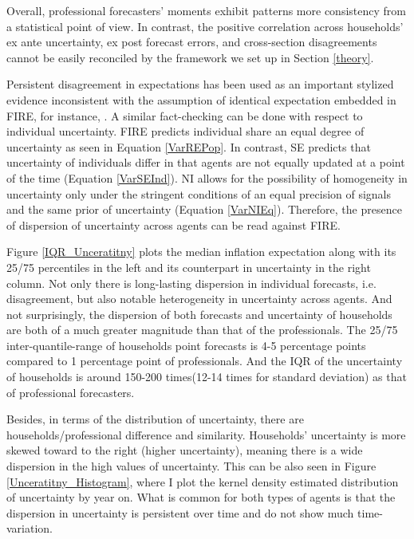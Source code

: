 \documentclass[12pt]{article}
\begin{document}
	Overall, professional forecasters' moments exhibit patterns more consistency from a statistical point of view.  In contrast, the positive correlation across households' ex ante uncertainty, ex post forecast errors, and cross-section disagreements cannot be easily reconciled by the framework we set up in Section \ref{theory}. 
	
	Persistent disagreement in expectations has been used as an important stylized evidence inconsistent with the assumption of identical expectation embedded in FIRE, for instance, \citet{mankiw2003disagreement}. A similar fact-checking can be done with respect to individual uncertainty. FIRE predicts individual share an equal degree of uncertainty as  seen in Equation \ref{VarREPop}. In contrast, SE predicts that uncertainty of individuals differ in that agents are not equally updated at a point of the time (Equation \ref{VarSEInd}). NI allows for the possibility of homogeneity in uncertainty only under the stringent conditions of an equal precision of signals and the same prior of uncertainty (Equation \ref{VarNIEq}). Therefore, the presence of dispersion of uncertainty across agents can be read against FIRE.  
	
	Figure \ref{IQR_Unceratitny} plots the median inflation expectation along with its 25/75 percentiles in the left and its counterpart in uncertainty in the right column.  Not only there is long-lasting dispersion in individual forecasts, i.e. disagreement, but also notable heterogeneity in uncertainty across agents.  And not surprisingly, the dispersion of both forecasts and uncertainty of households are both of a much greater magnitude than that of the professionals. The 25/75 inter-quantile-range of households point forecasts is 4-5 percentage points compared to 1 percentage point of professionals. And the IQR of the uncertainty of households is around 150-200 times(12-14 times for standard deviation) as that of professional forecasters.  
	
	Besides, in terms of the distribution of uncertainty, there are households/professional difference and similarity. Households' uncertainty is more skewed toward to the right (higher uncertainty), meaning there is a wide dispersion in the high values of uncertainty. This can be also seen in Figure \ref{Unceratitny_Histogram}, where I plot the kernel density estimated distribution of uncertainty by year on. What is common for both types of agents is that the dispersion in uncertainty is persistent over time and do not show much time-variation.  
	
\end{document}
